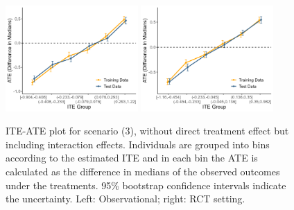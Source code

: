 \begin{figure}[htbp]
\centering
\includegraphics[width=0.45\textwidth]{img/results/observ_scenario3_ITE_cATE.png}
\includegraphics[width=0.45\textwidth]{img/results/rct_scenario3_ITE_cATE.png}
\caption{ITE-ATE plot for scenario (3), without direct treatment effect but including interaction effects. Individuals are grouped into bins according to the estimated ITE and in each bin the ATE is calculated as the difference in medians of the observed outcomes under the treatments. 95\% bootstrap confidence intervals indicate the uncertainty. Left: Observational; right: RCT setting.}
\label{fig:scenario3_ite_cATE}
\end{figure}


